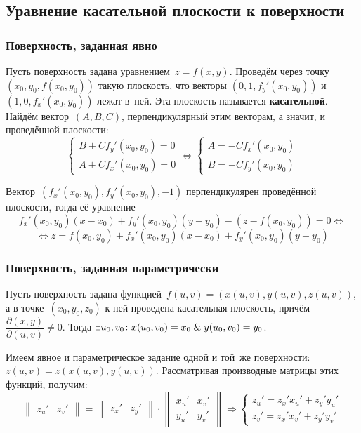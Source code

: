 \subsection{Уравнение касательной плоскости к поверхности}
\subsubsection{Поверхность, заданная явно}
Пусть поверхность задана уравнением~$z = f(x, y)$.
Проведём через точку~$(x_0, y_0, f(x_0, y_0))$ такую плоскость, что векторы $(0, 1, f_y'(x_0, y_0))$ и $(1, 0, f_x'(x_0, y_0))$ лежат в~ней.
Эта плоскость называется \textbf{касательной}.
Найдём вектор~$(A, B, C)$, перпендикулярный этим векторам, а значит, и проведённой плоскости:
\begin{equation*}
\begin{cases}
B + C f_y'(x_0, y_0) = 0 \\
A + C f_x'(x_0, y_0) = 0
\end{cases} \Leftrightarrow
\begin{cases}
A = -C f_x'(x_0, y_0) \\
B = -C f_y'(x_0, y_0)
\end{cases}
\end{equation*}

Вектор~$(f_x'(x_0, y_0), f_y'(x_0, y_0), -1)$ перпендикулярен проведённой плоскости, тогда её уравнение
\begin{equation*}
f_x'(x_0, y_0)(x - x_0) + f_y'(x_0, y_0)(y - y_0) - (z - f(x_0, y_0)) = 0 \Leftrightarrow
\end{equation*}
\begin{equation}
\label{eq:tangent_plane}
\Leftrightarrow z = f(x_0, y_0) + f_x'(x_0, y_0)(x - x_0) + f_y'(x_0, y_0)(y - y_0)
\end{equation}

\subsubsection{Поверхность, заданная параметрически}
Пусть поверхность задана функцией~$f(u, v) = (x(u, v), y(u, v), z(u, v))$, а в точке~$(x_0, y_0, z_0)$ к ней проведена касательная плоскость, причём $\dfrac{\partial(x, y)}{\partial(u, v)} \neq 0$.
Тогда $\exists u_0, v_0 \colon x(u_0, v_0) = x_0 \mathrel{\&} y(u_0, v_0) = y_0$.

Имеем явное и параметрическое задание одной и той~же поверхности: $z(u, v) = z(x(u, v), y(u, v))$.
Рассматривая производные матрицы этих функций, получим:
\begin{equation*}
\begin{Vmatrix}
z_u' & z_v'
\end{Vmatrix} =
\begin{Vmatrix}
z_x' & z_y'
\end{Vmatrix} \cdot
\begin{Vmatrix}
x_u' & x_v' \\
y_u' & y_v'
\end{Vmatrix} \Rightarrow
\begin{cases}
z_u' = z_x' x_u' + z_y' y_u' \\
z_v' = z_x' x_v' + z_y' y_v'
\end{cases}
\end{equation*}

